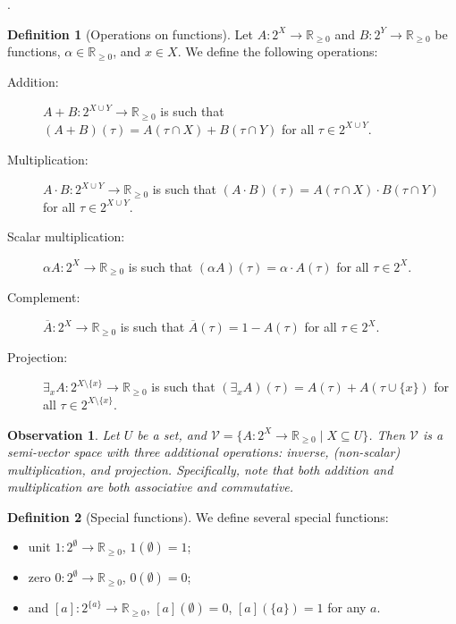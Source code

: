 \documentclass{article}
\newtheorem{observation}{Observation}
\theoremstyle{definition}
\newtheorem{definition}{Definition}
\theoremstyle{remark}
\begin{document}
{\cite{DBLP:conf/aaai/DudekPV20}.

\begin{definition}[Operations on functions]
  Let $A\colon 2^X \to \mathbb{R}_{\ge 0}$ and $B\colon 2^Y \to \mathbb{R}_{\ge
    0}$ be functions, $\alpha \in \mathbb{R}_{\ge 0}$, and $x \in X$. We define
  the following operations:
  \begin{description}
  \item[Addition:] $A+B\colon 2^{X \cup Y} \to \mathbb{R}_{\ge 0}$ is
    such that $(A+B)(\tau) = A(\tau \cap X) + B(\tau \cap Y)$ for all $\tau \in
    2^{X \cup Y}$.
  \item[Multiplication:] $A \cdot B\colon 2^{X \cup Y} \to \mathbb{R}_{\ge 0}$
    is such that $(A \cdot B)(\tau) = A(\tau \cap X) \cdot B(\tau
    \cap Y)$ for all $\tau \in 2^{X \cup Y}$.
  \item[Scalar multiplication:] $\alpha A\colon 2^X \to \mathbb{R}_{\ge 0}$ is
    such that $(\alpha A)(\tau) = \alpha \cdot A(\tau)$ for all $\tau
    \in 2^X$.
  \item[Complement:] $\overline{A}\colon 2^X \to \mathbb{R}_{\ge 0}$ is
    such that $\overline{A}(\tau) = 1 - A(\tau)$ for all $\tau \in 2^X$.
  \item[Projection:] $\exists_xA\colon 2^{X \setminus \{ x \}} \to
    \mathbb{R}_{\ge 0}$ is such that $(\exists_xA)(\tau) = A(\tau) +
    A(\tau \cup \{ x \})$ for all $\tau \in 2^{X \setminus \{x \}}$.
  \end{description}
\end{definition}

\begin{observation}
  Let $U$ be a set, and $\mathcal{V} = \{ A\colon 2^X \to \mathbb{R}_{\ge 0}
  \mid X \subseteq U \}$. Then $\mathcal{V}$ is a semi-vector space with three
  additional operations: inverse, (non-scalar) multiplication, and projection.
  Specifically, note that both addition and multiplication are both associative
  and commutative.
\end{observation}

\begin{definition}[Special functions]
  We define several special functions:
  \begin{itemize}
  \item unit $1\colon 2^\emptyset \to \mathbb{R}_{\ge 0}$, $1(\emptyset) = 1$;
  \item zero $0\colon 2^\emptyset \to \mathbb{R}_{\ge 0}$, $0(\emptyset) = 0$;
  \item and $[a]\colon 2^{\{a\}} \to \mathbb{R}_{\ge 0}$, $[a](\emptyset) = 0$,
    $[a](\{a\}) = 1$ for any $a$.
  \end{itemize}
\end{definition}

}
\end{document}
